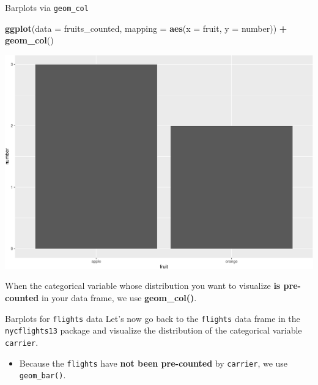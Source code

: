 \documentclass[
  ignorenonframetext,
]{beamer}
\newenvironment{Shaded}{\begin{snugshade}}{\end{snugshade}}
\newcommand{\AttributeTok}[1]{\textcolor[rgb]{0.13,0.29,0.53}{#1}}
\newcommand{\FunctionTok}[1]{\textcolor[rgb]{0.13,0.29,0.53}{\textbf{#1}}}
\newcommand{\NormalTok}[1]{#1}
\newcommand{\SpecialCharTok}[1]{\textcolor[rgb]{0.81,0.36,0.00}{\textbf{#1}}}
\providecommand{\tightlist}{%
  \setlength{\itemsep}{0pt}\setlength{\parskip}{0pt}}
\begin{document}
\begin{frame}[fragile]{Barplots via \texttt{geom\_col}}
\protect\hypertarget{barplots-via-geom_col}{}
\tiny

\begin{Shaded}
\begin{Highlighting}[]
\FunctionTok{ggplot}\NormalTok{(}\AttributeTok{data =}\NormalTok{ fruits\_counted, }\AttributeTok{mapping =} \FunctionTok{aes}\NormalTok{(}\AttributeTok{x =}\NormalTok{ fruit, }\AttributeTok{y =}\NormalTok{ number)) }\SpecialCharTok{+}
  \FunctionTok{geom\_col}\NormalTok{()}
\end{Highlighting}
\end{Shaded}

\begin{center}\includegraphics[width=0.9\linewidth,height=0.5\textheight]{Week2_files/figure-beamer/unnamed-chunk-39-1} \end{center}
\normalsize

When the categorical variable whose distribution you want to visualize
\textbf{is pre-counted} in your data frame, we use \textbf{geom\_col()}.
\end{frame}

\begin{frame}[fragile]{Barplots for \texttt{flights} data}
\protect\hypertarget{barplots-for-flights-data}{}
Let's now go back to the \texttt{flights} data frame in the
\texttt{nycflights13} package and visualize the distribution of the
categorical variable \texttt{carrier}.

\begin{itemize}
\tightlist
\item
  Because the \texttt{flights} have \textbf{not been pre-counted} by
  \texttt{carrier}, we use \texttt{geom\_bar()}.
\end{itemize}
\end{frame}
\end{document}
